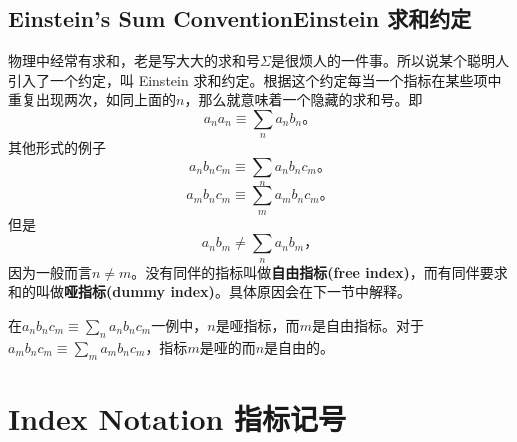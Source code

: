 \subsection[Einstein 求和约定]{Einstein’s Sum Convention\quad Einstein 求和约定}\label{appendix.B.4.3}
物理中经常有求和，老是写大大的求和号$\Sigma$是很烦人的一件事。所以说某个聪明人引入了一个约定，叫 Einstein 求和约定。根据这个约定每当一个指标在某些项中重复出现两次，如同上面的$n$，那么就意味着一个隐藏的求和号。即
\begin{equation}
a_na_n \equiv \sum\limits_n a_nb_n \text{。}
\end{equation}
其他形式的例子
\begin{equation}
a_nb_nc_m \equiv \sum\limits_n a_nb_nc_m \text{。}
\end{equation}
\begin{equation}
a_mb_nc_m \equiv \sum\limits_m a_mb_nc_m \text{。}
\end{equation}
但是
\begin{equation}
a_nb_m \ne \sum\limits_n a_nb_m\text{，}
\end{equation}
因为一般而言$n\ne m$。没有同伴的指标叫做{\bf 自由指标(free index)}，而有同伴要求和的叫做{\bf 哑指标(dummy index)}。具体原因会在下一节中解释。

在$a_nb_nc_m \equiv \sum\limits_n a_nb_nc_m$一例中，$n$是哑指标，而$m$是自由指标。对于$a_mb_nc_m \equiv \sum\limits_m a_mb_nc_m$，指标$m$是哑的而$n$是自由的。
\section[指标记号]{Index Notation 指标记号}\label{appendix.B.5}

